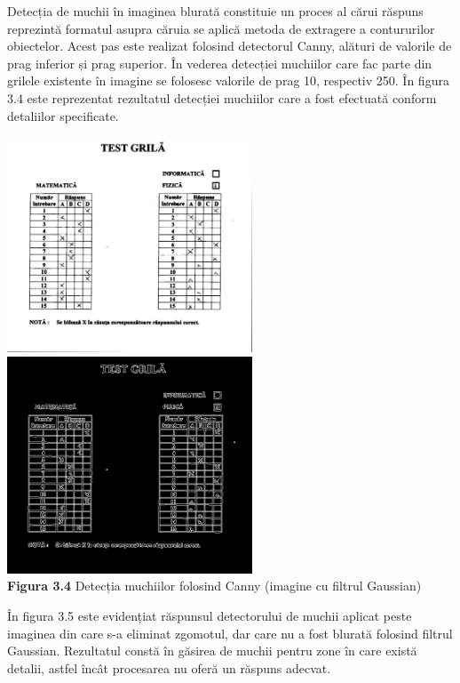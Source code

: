 \documentclass[a4paper,12pt]{report}
\newcommand\tab[1][1cm]{\hspace*{#1}}
\begin{document}
\tab Detecția de muchii în imaginea blurată constituie un proces al cărui răspuns reprezintă formatul asupra căruia se aplică metoda de extragere a contururilor obiectelor. Acest pas este realizat folosind detectorul Canny, alături de valorile de prag inferior și prag superior. În vederea detecției muchiilor care fac parte din grilele existente în imagine se folosesc valorile de prag 10, respectiv 250. În figura 3.4 este reprezentat rezultatul detecției muchiilor care a fost efectuată conform detaliilor specificate.
\begin {center} 
	\begin {footnotesize} 
		\includegraphics[width = 73mm]{fig3_4_1} 
		\includegraphics[width = 73mm]{fig3_4_2} \\
		\textbf  {Figura 3.4} Detecția muchiilor folosind Canny (imagine cu filtrul Gaussian)
	\end {footnotesize} 
\end {center}
\tab În figura 3.5 este evidențiat răspunsul detectorului de muchii aplicat peste imaginea din care s-a eliminat zgomotul, dar care nu a fost blurată folosind filtrul Gaussian. Rezultatul constă în găsirea de muchii pentru zone în care există detalii, astfel încât procesarea nu oferă un răspuns adecvat.
\end{document}
